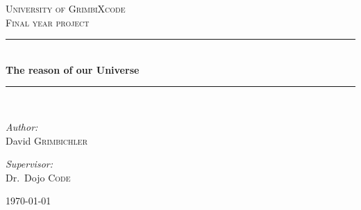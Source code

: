 \documentclass[a4paper, 11pt]{article}
\begin{document}
	\begin{titlepage}

		\begin{center}
			
			\textsc{\LARGE University of GrimbiXcode}\\[1.5cm]
			\textsc{\Large Final year project}\\[0.5cm]

			\newcommand{\HRule}{\rule{\linewidth}{0.5mm}}
			\HRule \\[0.4cm]
			{ \huge \bfseries The reason of our Universe}\\[0.4cm]
			\HRule \\[1.5cm]
			\begin{minipage}{0.4\textwidth}
				\begin{flushleft} \large
					\emph{Author:}\\
					David \textsc{Grimbichler}
				\end{flushleft}
			\end{minipage}
			\hfill
			\begin{minipage}{0.4\textwidth}
				\begin{flushright} \large
					\emph{Supervisor:} \\
					Dr.~Dojo \textsc{Code}
				\end{flushright}
			\end{minipage}
			\vfill
			{\large \today}

		\end{center}
	\end{titlepage}

\renewcommand{\contentsname}{Inhalt}
\tableofcontents

\newpage

\end{document}

